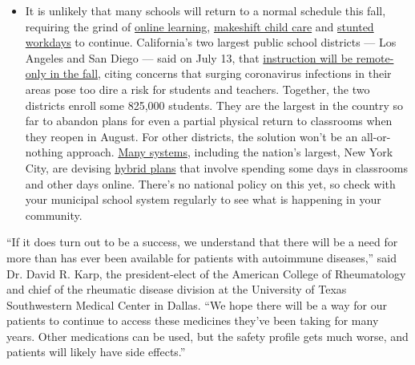 \begin{itemize}
  \begin{itemize}
  \tightlist
  \item
    It is unlikely that many schools will return to a normal schedule
    this fall, requiring the grind of
    \href{https://www.nytimes3xbfgragh.onion/2020/06/05/us/coronavirus-education-lost-learning.html?action=click\&pgtype=Article\&state=default\&region=MAIN_CONTENT_3\&context=storylines_faq}{online
    learning},
    \href{https://www.nytimes3xbfgragh.onion/2020/05/29/us/coronavirus-child-care-centers.html?action=click\&pgtype=Article\&state=default\&region=MAIN_CONTENT_3\&context=storylines_faq}{makeshift
    child care} and
    \href{https://www.nytimes3xbfgragh.onion/2020/06/03/business/economy/coronavirus-working-women.html?action=click\&pgtype=Article\&state=default\&region=MAIN_CONTENT_3\&context=storylines_faq}{stunted
    workdays} to continue. California's two largest public school
    districts --- Los Angeles and San Diego --- said on July 13, that
    \href{https://www.nytimes3xbfgragh.onion/2020/07/13/us/lausd-san-diego-school-reopening.html?action=click\&pgtype=Article\&state=default\&region=MAIN_CONTENT_3\&context=storylines_faq}{instruction
    will be remote-only in the fall}, citing concerns that surging
    coronavirus infections in their areas pose too dire a risk for
    students and teachers. Together, the two districts enroll some
    825,000 students. They are the largest in the country so far to
    abandon plans for even a partial physical return to classrooms when
    they reopen in August. For other districts, the solution won't be an
    all-or-nothing approach.
    \href{https://bioethics.jhu.edu/research-and-outreach/projects/eschool-initiative/school-policy-tracker/}{Many
    systems}, including the nation's largest, New York City, are
    devising
    \href{https://www.nytimes3xbfgragh.onion/2020/06/26/us/coronavirus-schools-reopen-fall.html?action=click\&pgtype=Article\&state=default\&region=MAIN_CONTENT_3\&context=storylines_faq}{hybrid
    plans} that involve spending some days in classrooms and other days
    online. There's no national policy on this yet, so check with your
    municipal school system regularly to see what is happening in your
    community.
  \end{itemize}
\end{itemize}

``If it does turn out to be a success, we understand that there will be
a need for more than has ever been available for patients with
autoimmune diseases,'' said Dr. David R. Karp, the president-elect of
the American College of Rheumatology and chief of the rheumatic disease
division at the University of Texas Southwestern Medical Center in
Dallas. ``We hope there will be a way for our patients to continue to
access these medicines they've been taking for many years. Other
medications can be used, but the safety profile gets much worse, and
patients will likely have side effects.''

